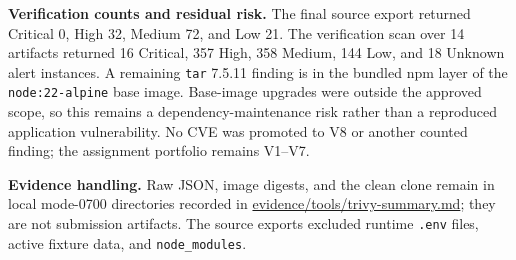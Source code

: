 \documentclass[11pt]{article}
\newcommand{\evidence}[1]{{\small\url{#1}}}
\begin{document}
\textbf{Verification counts and residual risk.} The final source export returned Critical 0, High 32, Medium 72, and Low 21. The verification scan over 14 artifacts returned 16 Critical, 357 High, 358 Medium, 144 Low, and 18 Unknown alert instances. A remaining \texttt{tar} 7.5.11 finding is in the bundled npm layer of the \texttt{node:22-alpine} base image. Base-image upgrades were outside the approved scope, so this remains a dependency-maintenance risk rather than a reproduced application vulnerability. No CVE was promoted to V8 or another counted finding; the assignment portfolio remains V1--V7.

\textbf{Evidence handling.} Raw JSON, image digests, and the clean clone remain in local mode-0700 directories recorded in \evidence{evidence/tools/trivy-summary.md}; they are not submission artifacts. The source exports excluded runtime \texttt{.env} files, active fixture data, and \texttt{node\_modules}.
\end{document}
